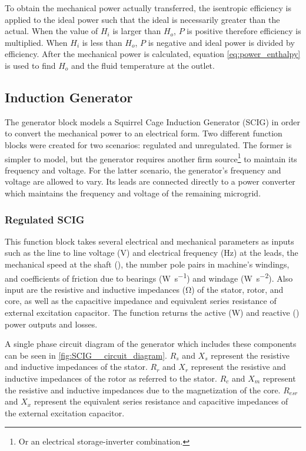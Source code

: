 To obtain the mechanical power actually transferred, the isentropic efficiency is applied to the ideal power such that the ideal is necessarily greater than the actual. When the value of $H_i$ is larger than $H_o$, $P$ is positive therefore efficiency is multiplied. When $H_i$ is less than $H_o$, $P$ is negative and ideal power is divided by efficiency. After the mechanical power is calculated, equation \ref{eq:power_enthalpy} is used to find $H_o$ and the fluid temperature at the outlet. 

\subsection{Induction Generator}
The generator block models a Squirrel Cage Induction Generator (SCIG) in order to convert the mechanical power to an electrical form. Two different function blocks were created for two scenarios: regulated and unregulated. The former is simpler to model, but the generator requires another firm source\footnote{Or an electrical storage-inverter combination.} to maintain its frequency and voltage. For the latter scenario, the generator's frequency and voltage are allowed to vary. Its leads are connected directly to a power converter which maintains the frequency and voltage of the remaining microgrid. 

\subsubsection{Regulated SCIG}
This function block takes several electrical and mechanical parameters as inputs such as the line to line voltage (\si{\volt}) and electrical frequency (\si{\hertz}) at the leads, the mechanical speed at the shaft (\si{\rpm}), the number pole pairs in machine's windings, and coefficients of friction due to bearings (\si{\watt\per\second}) and windage (\si{\watt\per\second\squared}). Also input are the resistive and inductive impedances (\si{\ohm}) of the stator, rotor, and core, as well as the capacitive impedance and equivalent series resistance of external excitation capacitor. The function returns the active (\si{\watt}) and reactive (\si{\voltampreactive}) power outputs and losses.


A single phase circuit diagram of the generator which includes these components can be seen in \autoref{fig:SCIG__circuit_diagram}. $R_s$ and $X_s$ represent the resistive and inductive impedances of the stator. $R_r$ and $X_r$ represent the resistive and inductive impedances of the rotor as referred to the stator. $R_c$ and $X_m$ represent the resistive and inductive impedances due to the magnetization of the core. $R_{esr}$ and $X_x$ represent the equivalent series resistance and capacitive impedances of the external excitation capacitor.

